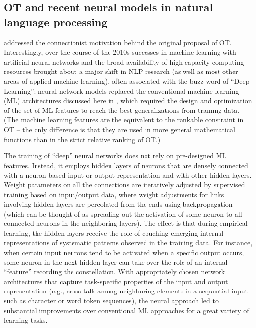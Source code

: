 \documentclass[output=paper,hidelinks]{langscibook}
\begin{document}
\subsection{OT and recent neural models in natural language processing}
\label{sec:OT:OT-recent-neural}

 addressed the connectionist motivation behind the original proposal of OT. Interestingly, over the course of the 2010s successes in machine learning with artificial neural networks \citep{Henderson2020} and the broad availability of high-capacity computing resources brought about a major shift in NLP research (as well as most other areas of applied machine learning), often associated with the buzz word of ``Deep Learning'': neural network models replaced the conventional machine learning (ML) architectures discussed here in , which required the design and optimization of the set of ML features to reach the best generalizations from training data. (The machine learning features are the equivalent to the rankable constraint in OT -- the only difference is that they are used in more general mathematical functions than in the strict relative ranking of OT.)

The training of ``deep'' neural networks does not rely on pre-designed ML features. Instead, it employs hidden layers of neurons that are densely connected with a neuron-based input or output representation and with other hidden layers. Weight parameters on all the connections are iteratively adjusted by supervised training based on input/output data, where weight adjustments for links involving hidden layers are percolated from the ends using backpropagation (which can be thought of as spreading out the activation of some neuron to all connected neurons in the neighboring layers). %
The effect is that during empirical learning, the hidden layers receive the role of couching emerging internal representations of systematic patterns observed in the training data. For instance, when certain input neurons tend to be activated when a specific output occurs, some neuron in the next hidden layer can take over the role of an internal ``feature'' recording the constellation. With appropriately chosen network architectures that capture task-specific properties of the input and output representation (e.g., cross-talk among neighboring elements in a sequential input such as character or word token sequences), the neural approach led to substantial improvements over conventional ML approaches for a great variety of learning tasks.
\end{document}
